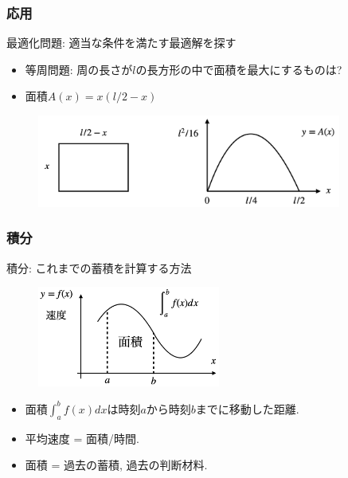 \documentclass[dvipdfmx,cjk,10.2pt]{beamer}
\theoremstyle{definition}
\begin{document}


\begin{frame}
\frametitle{応用}   

最適化問題: 適当な条件を満たす最適解を探す

\begin{itemize}
\item 等周問題: 周の長さが$l$の長方形の中で面積を最大にするものは? 
\item 面積$A(x)=x(l/2-x)$
\end{itemize}

 \begin{figure}[htbp]
 \begin{center} 
  \includegraphics[width=100mm]{LecArea.png}
 \end{center}
\end{figure}

\end{frame}




\begin{frame}
\frametitle{積分}

積分: これまでの蓄積を計算する方法

 \begin{figure}[htbp]
 \begin{center} 
  \includegraphics[width=60mm]{int_speed.png}
 \end{center}
\end{figure}


\begin{itemize}
\item 面積$\int_a^b f(x)dx$は時刻$a$から時刻$b$までに移動した距離. 
\item 平均速度 = 面積/時間. 
\item 面積 = 過去の蓄積, 過去の判断材料.
\end{itemize}

\end{frame}
\end{document}
